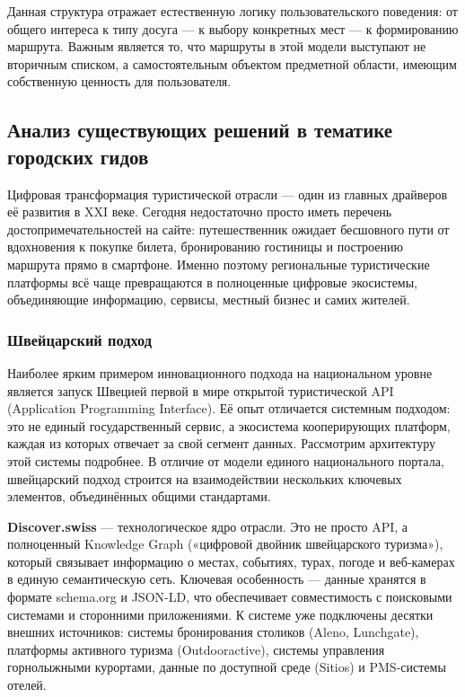 Данная структура отражает естественную логику пользовательского поведения: от общего интереса к типу досуга --- к выбору конкретных мест --- к формированию маршрута. Важным является то, что маршруты в этой модели выступают не вторичным списком, а самостоятельным объектом предметной области, имеющим собственную ценность для пользователя.

\subsection{Анализ существующих решений в тематике городских гидов}

Цифровая трансформация туристической отрасли — один из главных драйверов её развития в XXI веке. Сегодня недостаточно просто иметь перечень достопримечательностей на сайте: путешественник ожидает бесшовного пути от вдохновения к покупке билета, бронированию гостиницы и построению маршрута прямо в смартфоне. Именно поэтому региональные туристические платформы всё чаще превращаются в полноценные цифровые экосистемы, объединяющие информацию, сервисы, местный бизнес и самих жителей.
\subsubsection{Швейцарский подход}

Наиболее ярким примером инновационного подхода на национальном уровне является запуск Швецией первой в мире открытой туристической API (Application Programming Interface). Её опыт отличается системным подходом: это не единый государственный сервис, а экосистема кооперирующих платформ, каждая из которых отвечает за свой сегмент данных. Рассмотрим архитектуру этой системы подробнее.
В отличие от модели единого национального портала, швейцарский подход строится на взаимодействии нескольких ключевых элементов, объединённых общими стандартами.

\textbf{Discover.swiss} --- технологическое ядро отрасли. Это не просто API, а полноценный Knowledge Graph («цифровой двойник швейцарского туризма»), который связывает информацию о местах, событиях, турах, погоде и веб-камерах в единую семантическую сеть. Ключевая особенность — данные хранятся в формате schema.org и JSON-LD, что обеспечивает совместимость с поисковыми системами и сторонними приложениями. К системе уже подключены десятки внешних источников: системы бронирования столиков (Aleno, Lunchgate), платформы активного туризма (Outdooractive), системы управления горнолыжными курортами, данные по доступной среде (Sitios) и PMS-системы отелей.

